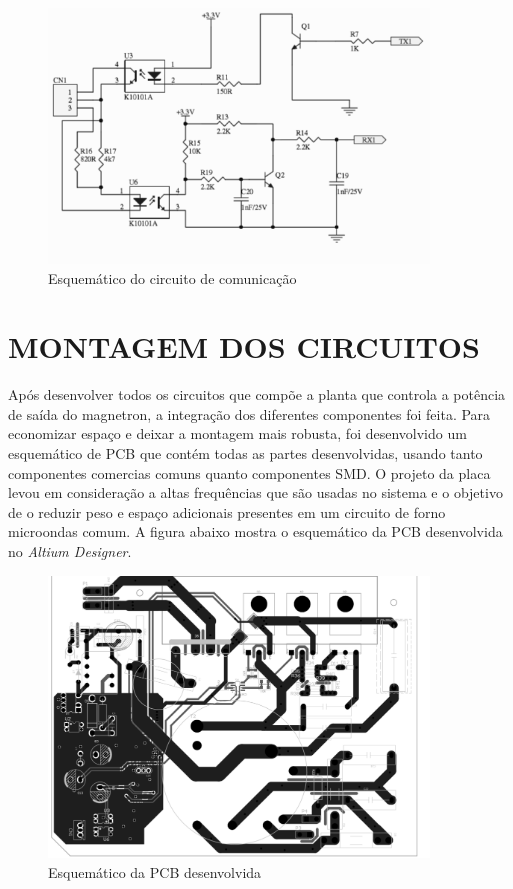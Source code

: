\begin{figure}[H]
    \centering
    \includegraphics[width=0.9\textwidth]{./dados/figuras/proj-comm}
    \caption{Esquemático do circuito de comunicação}
    \label{fig:figura-comm}
\end{figure}



\section{MONTAGEM DOS CIRCUITOS}
\label{sec:montagem}
Após desenvolver todos os circuitos que compõe a planta que controla a potência de saída do magnetron, a integração dos diferentes componentes foi feita. Para economizar espaço e deixar a montagem mais robusta, foi desenvolvido um esquemático de PCB que contém todas as partes desenvolvidas, usando tanto componentes comercias comuns quanto componentes SMD. O projeto da placa levou em consideração a altas frequências que são usadas no sistema e o objetivo de o reduzir peso e espaço adicionais presentes em um circuito de forno microondas comum. A figura abaixo mostra o esquemático da PCB desenvolvida no \textit{Altium Designer}.

\begin{figure}[H]
    \centering
    \includegraphics[width=0.9\textwidth]{./dados/figuras/proj-pcb}
    \caption{Esquemático da PCB desenvolvida}
    \label{fig:figura-montagem}
\end{figure}

